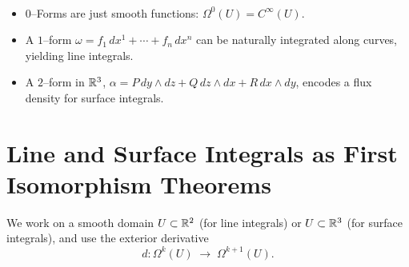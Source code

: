 \documentclass[11pt,openany]{article}
\begin{document}
%
\begin{remark}
	\ \begin{itemize}
		\item \(0\)–Forms are just smooth functions: \(\Omega^0(U)=C^\infty(U)\).
		\item A \(1\)–form \(\omega=f_1\,dx^1+\cdots+f_n\,dx^n\) can be naturally integrated along curves, yielding line integrals.
		\item A \(2\)–form in \(\mathbb{R}^3\), \(\alpha=P\,dy\wedge dz+Q\,dz\wedge dx+R\,dx\wedge dy\), encodes a flux density for surface integrals.
	\end{itemize}
\end{remark}
\newpage
\section{Line and Surface Integrals as First Isomorphism Theorems}

We work on a smooth domain \(U\subset\mathbb{R}^2\) (for line integrals) or \(U\subset\mathbb{R}^3\) (for surface integrals), and use the exterior derivative
\[
d:\Omega^k(U)\;\longrightarrow\;\Omega^{k+1}(U).
\]
\end{document}
